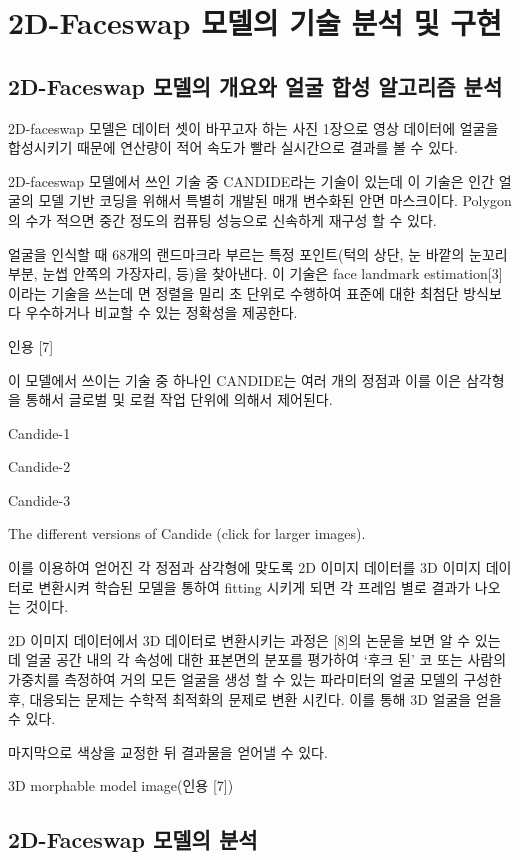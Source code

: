 \documentclass{oblivoir}
\begin{document}
\chapter{ 2D-Faceswap 모델의 기술 분석 및 구현 }

  \section{2D-Faceswap 모델의 개요와 얼굴 합성 알고리즘 분석}

 2D-faceswap 모델은 데이터 셋이 바꾸고자 하는 사진 1장으로 영상 데이터에 얼굴을 합성시키기 때문에 연산량이 적어 속도가 빨라 실시간으로 결과를 볼 수 있다. 

2D-faceswap 모델에서 쓰인 기술 중 CANDIDE라는 기술이 있는데 이 기술은 인간 얼굴의 모델 기반 코딩을 위해서 특별히 개발된 매개 변수화된 안면 마스크이다. Polygon의 수가 적으면 중간 정도의 컴퓨팅 성능으로 신속하게 재구성 할 수 있다.

얼굴을 인식할 때 68개의 랜드마크라 부르는 특정 포인트(턱의 상단, 눈 바깥의 눈꼬리부분, 눈썹 안쪽의 가장자리, 등)을 찾아낸다. 이 기술은 face landmark estimation[3]이라는 기술을 쓰는데 면 정렬을 밀리 초 단위로 수행하여 표준에 대한 최첨단 방식보다 우수하거나 비교할 수 있는 정확성을 제공한다. 

 인용 [7]

이 모델에서 쓰이는 기술 중 하나인 CANDIDE는 여러 개의 정점과 이를 이은 삼각형을 통해서 글로벌 및 로컬 작업 단위에 의해서 제어된다.

     

Candide-1

Candide-2

Candide-3

The different versions of Candide (click for larger images).

이를 이용하여 얻어진 각 정점과 삼각형에 맞도록 2D 이미지 데이터를 3D 이미지 데이터로 변환시켜 학습된 모델을 통하여 fitting 시키게 되면 각 프레임 별로 결과가 나오는 것이다.

2D 이미지 데이터에서 3D 데이터로 변환시키는 과정은 [8]의 논문을 보면 알 수 있는데 
얼굴 공간 내의 각 속성에 대한 표본면의 분포를 평가하여 ‘후크 된’ 코 또는 사람의 가중치를 측정하여 거의 모든 얼굴을 생성 할 수 있는 파라미터의 얼굴 모델의 구성한 후, 대응되는 문제는 수학적 최적화의 문제로 변환 시킨다. 이를 통해 3D 얼굴을 얻을 수 있다.

마지막으로 색상을 교정한 뒤 결과물을 얻어낼 수 있다.

3D morphable model image(인용 [7])

 \section{2D-Faceswap 모델의 분석}
\end{document}
